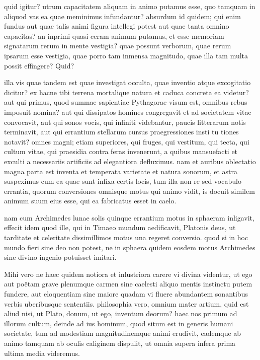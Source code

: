  quid igitur? utrum capacitatem aliquam in animo putamus esse, quo tamquam in aliquod vas ea quae meminimus infundantur? absurdum id quidem; qui enim fundus aut quae talis animi figura intellegi potest aut quae tanta omnino capacitas? an inprimi quasi ceram animum putamus, et esse memoriam signatarum rerum in mente vestigia? quae possunt verborum, quae rerum ipsarum esse vestigia, quae porro tam inmensa magnitudo, quae illa tam multa possit effingere? Quid?

 illa vis quae tandem est quae investigat occulta, quae inventio atque excogitatio dicitur? ex hacne tibi terrena mortalique natura et caduca concreta ea videtur? aut qui primus, quod summae sapientiae Pythagorae visum est, omnibus rebus imposuit nomina? aut qui dissipatos homines congregavit et ad societatem vitae convocavit, aut qui sonos vocis, qui infiniti videbantur, paucis litterarum notis terminavit, aut qui errantium stellarum cursus praegressiones insti tu tiones notavit? omnes magni; etiam superiores, qui fruges, qui vestitum, qui tecta, qui cultum vitae, qui praesidia contra feras invenerunt, a quibus mansuefacti et exculti a necessariis artificiis ad elegantiora defluximus. nam et auribus oblectatio magna parta est inventa et temperata varietate et natura sonorum, et astra suspeximus cum ea quae sunt infixa certis locis, tum illa non re sed vocabulo errantia, quorum conversiones omnisque motus qui animo vidit, is docuit similem animum suum eius esse, qui ea fabricatus esset in caelo.

 nam cum Archimedes lunae solis quinque errantium motus in sphaeram inligavit, effecit idem quod ille, qui in Timaeo mundum aedificavit, Platonis deus, ut tarditate et celeritate dissimillimos motus una regeret conversio. quod si in hoc mundo fieri sine deo non potest, ne in sphaera quidem eosdem motus Archimedes sine divino ingenio potuisset imitari.

 Mihi vero ne haec quidem notiora et inlustriora carere vi divina videntur, ut ego aut poëtam grave plenumque carmen sine caelesti aliquo mentis instinctu putem fundere, aut eloquentiam sine maiore quadam vi fluere abundantem sonantibus verbis uberibusque sententiis. philosophia vero, omnium mater artium, quid est aliud nisi, ut Plato, donum, ut ego, inventum deorum? haec nos primum ad illorum cultum, deinde ad ius hominum, quod situm est in generis humani societate, tum ad modestiam magnitudinemque animi erudivit, eademque ab animo tamquam ab oculis caliginem dispulit, ut omnia supera infera prima ultima media videremus.

